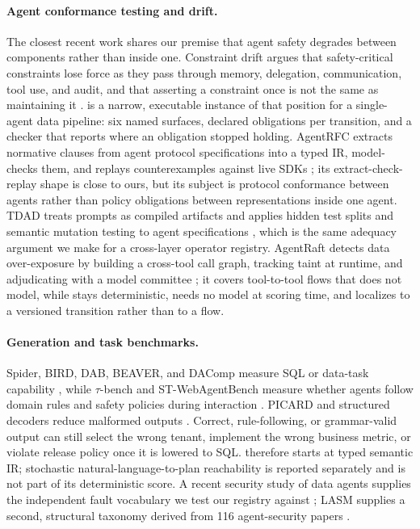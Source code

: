 \paragraph{Agent conformance testing and drift.}
The closest recent work shares our premise that agent safety degrades between components rather than inside one. Constraint drift argues that safety-critical constraints lose force as they pass through memory, delegation, communication, tool use, and audit, and that asserting a constraint once is not the same as maintaining it \citep{constraint_drift}. \policystrata{} is a narrow, executable instance of that position for a single-agent data pipeline: six named surfaces, declared obligations per transition, and a checker that reports where an obligation stopped holding. AgentRFC extracts normative clauses from agent protocol specifications into a typed IR, model-checks them, and replays counterexamples against live SDKs \citep{agentrfc}; its extract-check-replay shape is close to ours, but its subject is protocol conformance between agents rather than policy obligations between representations inside one agent. TDAD treats prompts as compiled artifacts and applies hidden test splits and semantic mutation testing to agent specifications \citep{tdad}, which is the same adequacy argument we make for a cross-layer operator registry. AgentRaft detects data over-exposure by building a cross-tool call graph, tracking taint at runtime, and adjudicating with a model committee \citep{agentraft}; it covers tool-to-tool flows that \policystrata{} does not model, while \policystrata{} stays deterministic, needs no model at scoring time, and localizes to a versioned transition rather than to a flow.

\paragraph{Generation and task benchmarks.}
Spider, BIRD, DAB, BEAVER, and DAComp measure SQL or data-task capability \citep{spider,bird,dab,beaver,dacomp}, while $\tau$-bench and ST-WebAgentBench measure whether agents follow domain rules and safety policies during interaction \citep{taubench,stwebagentbench}. PICARD and structured decoders reduce malformed outputs \citep{picard,outlines,xgrammar,jsonschemabench}. Correct, rule-following, or grammar-valid output can still select the wrong tenant, implement the wrong business metric, or violate release policy once it is lowered to SQL. \policystrata{} therefore starts at typed semantic IR; stochastic natural-language-to-plan reachability is reported separately and is not part of its deterministic score. A recent security study of data agents supplies the independent fault vocabulary we test our registry against \citep{data_agents_under_attack}; LASM supplies a second, structural taxonomy derived from 116 agent-security papers \citep{lasm}.

